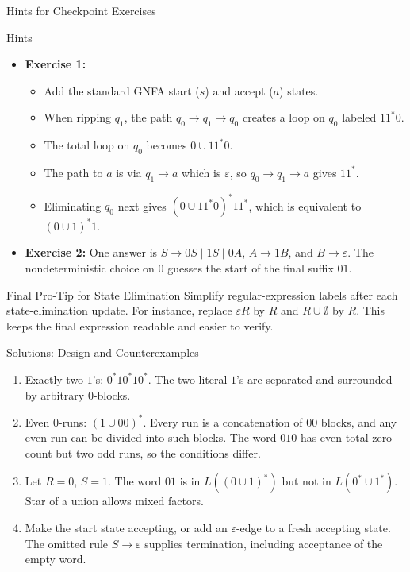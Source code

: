 \documentclass[10pt]{beamer}
\begin{document}
\begin{frame}{Hints for Checkpoint Exercises}
  \begin{block}{Hints}
    \begin{itemize}
      \item \textbf{Exercise 1:}
        \begin{itemize}
          \item Add the standard GNFA start ($s$) and accept ($a$) states.
          \item When ripping $q_1$, the path $q_0 \rightarrow q_1 \rightarrow q_0$ creates a loop on $q_0$ labeled $11^*0$.
          \item The total loop on $q_0$ becomes $0 \cup 11^*0$.
          \item The path to $a$ is via $q_1 \rightarrow a$ which is $\varepsilon$, so $q_0 \rightarrow q_1 \rightarrow a$ gives $11^*$.
          \item Eliminating $q_0$ next gives
            $(0\cup11^*0)^{*}11^*$, which is equivalent to
            $(0\cup1)^{*}1$.
        \end{itemize}
      \item \textbf{Exercise 2:} One answer is
        $S\rightarrow0S\mid1S\mid0A$, $A\rightarrow1B$, and
        $B\rightarrow\varepsilon$. The nondeterministic choice on $0$ guesses
        the start of the final suffix $01$.
    \end{itemize}
  \end{block}
  \pause
  \begin{alertblock}{Final Pro-Tip for State Elimination}
    Simplify regular-expression labels after each state-elimination update.
    For instance, replace $\varepsilon R$ by $R$ and $R\cup\emptyset$ by $R$.
    This keeps the final expression readable and easier to verify.
  \end{alertblock}
\end{frame}

\begin{frame}{Solutions: Design and Counterexamples}
  \small
  \begin{enumerate}
    \item Exactly two $1$'s: $0^*10^*10^*$. The two literal $1$'s are
      separated and surrounded by arbitrary $0$-blocks.
    \pause
    \item Even $0$-runs: $(1\cup00)^*$. Every run is a concatenation of
      $00$ blocks, and any even run can be divided into such blocks.
      The word $010$ has even total zero count but two odd runs, so the
      conditions differ.
    \pause
    \item Let $R=0$, $S=1$. The word $01$ is in $L((0\cup1)^*)$ but
      not in $L(0^*\cup1^*)$. Star of a union allows mixed factors.
    \pause
    \item Make the start state accepting, or add an $\varepsilon$-edge to
      a fresh accepting state. The omitted rule $S\to\varepsilon$ supplies
      termination, including acceptance of the empty word.
  \end{enumerate}
\end{frame}
\end{document}

